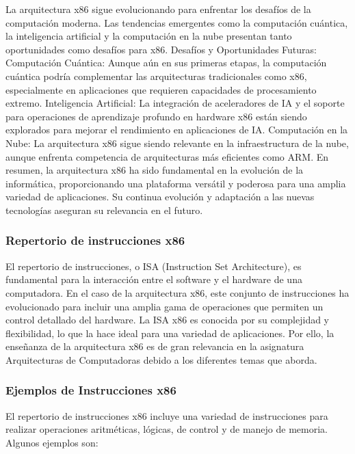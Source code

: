 \documentclass[12pt,twoside]{templates/unerthesis}
\begin{document}
La arquitectura x86 sigue evolucionando para enfrentar los desafíos de la computación moderna. Las tendencias emergentes como la computación cuántica, la inteligencia artificial y la computación en la nube presentan tanto oportunidades como desafíos para x86.
Desafíos y Oportunidades Futuras:
Computación Cuántica: Aunque aún en sus primeras etapas, la computación cuántica podría complementar las arquitecturas tradicionales como x86, especialmente en aplicaciones que requieren capacidades de procesamiento extremo.
Inteligencia Artificial: La integración de aceleradores de IA y el soporte para operaciones de aprendizaje profundo en hardware x86 están siendo explorados para mejorar el rendimiento en aplicaciones de IA.
Computación en la Nube: La arquitectura x86 sigue siendo relevante en la infraestructura de la nube, aunque enfrenta competencia de arquitecturas más eficientes como ARM.
En resumen, la arquitectura x86 ha sido fundamental en la evolución de la informática, proporcionando una plataforma versátil y poderosa para una amplia variedad de aplicaciones. Su continua evolución y adaptación a las nuevas tecnologías aseguran su relevancia en el futuro.

\hypertarget{repertorio-de-instrucciones-x86}{%
\subsubsection{Repertorio de instrucciones x86}\label{repertorio-de-instrucciones-x86}}

El repertorio de instrucciones, o ISA (Instruction Set Architecture), es fundamental para la interacción entre el software y el hardware de una computadora. En el caso de la arquitectura x86, este conjunto de instrucciones ha evolucionado para incluir una amplia gama de operaciones que permiten un control detallado del hardware. La ISA x86 es conocida por su complejidad y flexibilidad, lo que la hace ideal para una variedad de aplicaciones.
Por ello, la enseñanza de la arquitectura x86 es de gran relevancia en la asignatura Arquitecturas de Computadoras debido a los diferentes temas que aborda.

\hypertarget{ejemplos-de-instrucciones-x86}{%
\subsubsection{Ejemplos de Instrucciones x86}\label{ejemplos-de-instrucciones-x86}}

El repertorio de instrucciones x86 incluye una variedad de instrucciones para realizar operaciones aritméticas, lógicas, de control y de manejo de memoria. Algunos ejemplos son:
\end{document}
